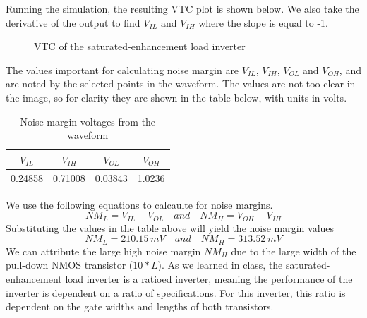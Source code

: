 \documentclass[12pt]{article}
\begin{document}
\pagebreak
Running the simulation, the resulting VTC plot is shown below. We also take the derivative of the output to find
$V_{IL}$ and $V_{IH}$ where the slope is equal to -1.
\begin{figure} [H]
    \centering
    \caption{VTC of the saturated-enhancement load inverter}
\end{figure}
The values important for calculating noise margin are $V_{IL}$, $V_{IH}$, $V_{OL}$ and $V_{OH}$, and are noted by the selected points in the waveform.
The values are not too clear in the image, so for clarity they are shown in the table below, with units in volts.
\begin{table} [H]
    \centering
    \begin{tabular} {cccc} 
        $V_{IL}$ & $V_{IH}$ & $V_{OL}$ & $V_{OH}$\\
        \hline
        0.24858 & 0.71008 & 0.03843 & 1.0236
    \end{tabular}
    \caption{Noise margin voltages from the waveform}
\end{table}
We use the following equations to calcaulte for noise margins.
\[NM_L = V_{IL} - V_{OL} \quad and \quad NM_H = V_{OH} - V_{IH}\]
Substituting the values in the table above will yield the noise margin values
\[NM_L = \SI{210.15}{mV} \quad and \quad NM_H = \SI{313.52}{mV}\]
We can attribute the large high noise margin $NM_H$ due to the large width of the pull-down NMOS transistor ($10*L$). As we learned in class, the 
saturated-enhancement load inverter is a ratioed inverter, meaning the performance of the inverter is dependent on a ratio of specifications.
For this inverter, this ratio is dependent on the gate widths and lengths of both transistors.
\end{document}
